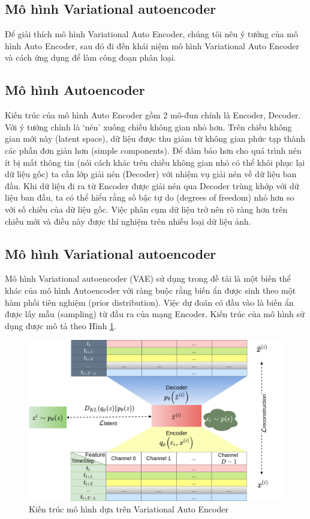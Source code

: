 \subsection{Mô hình Variational autoencoder}
Để giải thích mô hình Variational Auto Encoder, chúng tôi nêu ý tưởng của mô hình Auto Encoder, sau đó đi đến khái niệm mô hình Variational Auto Encoder và cách ứng dụng để làm công đoạn phân loại.
\subsection{Mô hình Autoencoder}
Kiến trúc của mô hình Auto Encoder gồm 2 mô-đun chính là Encoder, Decoder. Với ý tưởng chính là `nén' xuống chiều không gian nhỏ hơn. Trên chiều không gian mới này (latent space), dữ liệu được thu giảm từ không gian phức tạp thành các phần đơn giản hơn (simple components). Để đảm bảo hơn cho quá trình nén ít bị mất thông tin (nói cách khác trên chiều không gian nhỏ có thể khôi phục lại dữ liệu gốc) ta cần lớp giải nén (Decoder) với nhiệm vụ giải nén về dữ liệu ban đầu. Khi dữ liệu đi ra từ Encoder được giải nén qua Decoder trùng khớp với dữ liệu ban đầu, ta có thể hiểu rằng số  bậc tự do (degrees of freedom) nhỏ hơn so với số chiều của dữ liệu gốc. Việc phân cụm dữ liệu trở nên rõ ràng hơn trên chiều mới và điều này được thí nghiệm trên nhiều loại dữ liệu ảnh\cite{autoencoder-for-molecular-design}.
\subsection{Mô hình Variational autoencoder}
Mô hình Variational autoencoder (VAE) sử dụng trong đề tài là một biến thể khác của mô hình Autoencoder với ràng buộc rằng biến ẩn được sinh theo một hàm phối tiên nghiệm (prior distribution). Việc dự đoán có đầu vào là biến ẩn được lấy mẫu (sampling) từ đầu ra của mạng Encoder. Kiến trúc của mô hình sử dụng được mô tả theo Hình \ref{fig:VAE-arch}.
\begin{figure}[H]
	\center	\includegraphics[width=1.0\textwidth]{figures/VAE/pngs/VAE_Arch.png}
	\caption{Kiến trúc mô hình dựa trên Variational Auto Encoder}
	\label{fig:VAE-arch}
\end{figure}

